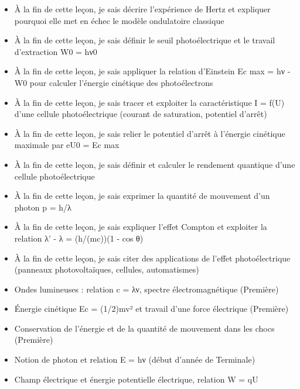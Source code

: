 \documentclass[11pt]{article}
\begin{document}
\begin{objectifs}
\begin{itemize}
\item À la fin de cette leçon, je sais décrire l'expérience de Hertz et expliquer pourquoi elle met en échec le modèle ondulatoire classique
\item À la fin de cette leçon, je sais définir le seuil photoélectrique et le travail d'extraction W0 = hν0
\item À la fin de cette leçon, je sais appliquer la relation d'Einstein Ec max = hν - W0 pour calculer l'énergie cinétique des photoélectrons
\item À la fin de cette leçon, je sais tracer et exploiter la caractéristique I = f(U) d'une cellule photoélectrique (courant de saturation, potentiel d'arrêt)
\item À la fin de cette leçon, je sais relier le potentiel d'arrêt à l'énergie cinétique maximale par eU0 = Ec max
\item À la fin de cette leçon, je sais définir et calculer le rendement quantique d'une cellule photoélectrique
\item À la fin de cette leçon, je sais exprimer la quantité de mouvement d'un photon p = h/λ
\item À la fin de cette leçon, je sais expliquer l'effet Compton et exploiter la relation λ' - λ = (h/(mc))(1 - cos θ)
\item À la fin de cette leçon, je sais citer des applications de l'effet photoélectrique (panneaux photovoltaïques, cellules, automatismes)
\end{itemize}
\end{objectifs}

\begin{prerequis}
\begin{itemize}
\item Ondes lumineuses : relation c = λν, spectre électromagnétique (Première)
\item Énergie cinétique Ec = (1/2)mv² et travail d'une force électrique (Première)
\item Conservation de l'énergie et de la quantité de mouvement dans les chocs (Première)
\item Notion de photon et relation E = hν (début d'année de Terminale)
\item Champ électrique et énergie potentielle électrique, relation W = qU
\end{itemize}
\end{prerequis}
\end{document}
